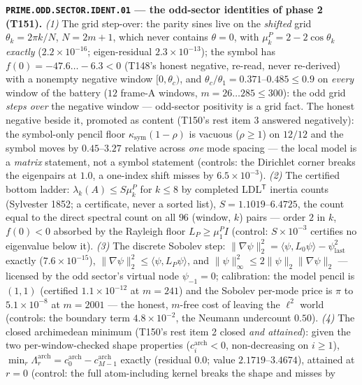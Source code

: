 \documentclass[11pt,a4paper]{article}
\begin{document}
\par\smallskip\noindent\textbf{\texttt{PRIME.ODD.SECTOR.IDENT.01} --- the
odd-sector identities of phase 2 (T151).}
\emph{(1)} The grid step-over: the parity sines live on the \emph{shifted}
grid $\theta_k=2\pi k/N$, $N=2m{+}1$, which never contains $\theta=0$, with
$\mu^P_k=2-2\cos\theta_k$ \emph{exactly} ($2.2\times10^{-16}$;
eigen-residual $2.3\times10^{-13}$); the symbol has
$f(0)=-47.6\ldots-6.3<0$ (T148's honest negative, re-read, never
re-derived) with a nonempty negative window $[0,\theta_c)$, and
$\theta_c/\theta_1=0.371$--$0.485\le0.9$ on \emph{every} window of the
battery ($12$ frame-A windows, $m=26\ldots285\le300$): the odd grid
\emph{steps over} the negative window --- odd-sector positivity is a grid
fact. The honest negative beside it, promoted as content (T150's rest item
3 answered negatively): the symbol-only pencil floor
$\kappa_{\mathrm{sym}}(1-\rho)$ is vacuous ($\rho\ge1$) on $12/12$ and the
symbol moves by $0.45$--$3.27$ relative across \emph{one} mode spacing ---
the local model is a \emph{matrix} statement, not a symbol statement
(controls: the Dirichlet corner breaks the eigenpairs at $1.0$, a one-index
shift misses by $6.5\times10^{-3}$). \emph{(2)} The certified bottom
ladder: $\lambda_k(A)\le S\mu^P_k$ for $k\le8$ by completed
LDL$^{\mathsf T}$ inertia counts (Sylvester 1852; a certificate, never a
sorted list), $S=1.1019$--$6.4725$, the count equal to the direct spectral
count on all $96$ (window, $k$) pairs --- order $2$ in $k$, $f(0)<0$
absorbed by the Rayleigh floor $L_P\ge\mu^P_1I$ (control:
$S\times10^{-3}$ certifies no eigenvalue below it). \emph{(3)} The discrete
Sobolev step: $\|\nabla\psi\|_2^2=\langle\psi,L_0\psi\rangle-
\psi_{\mathrm{last}}^2$ exactly ($7.6\times10^{-15}$),
$\|\nabla\psi\|_2^2\le\langle\psi,L_P\psi\rangle$, and
$\|\psi\|_\infty^2\le2\|\psi\|_2\|\nabla\psi\|_2$ --- licensed by the odd
sector's virtual node $\psi_{-1}=0$; calibration: the model pencil is
$(1,1)$ (certified $1.1\times10^{-12}$ at $m=241$) and the Sobolev
per-mode price is $\pi$ to $5.1\times10^{-8}$ at $m=2001$ --- the honest,
$m$-free cost of leaving the $\ell^2$ world (controls: the boundary term
$4.8\times10^{-2}$, the Neumann undercount $0.50$). \emph{(4)} The closed
archimedean minimum (T150's rest item 2 closed \emph{and attained}): given
the two per-window-checked shape properties ($c^{\mathrm{arch}}_i<0$,
non-decreasing on $i\ge1$),
$\min_r\Lambda^{\mathrm{arch}}_r=c^{\mathrm{arch}}_0-c^{\mathrm{arch}}_{M-1}$
exactly (residual $0.0$; value $2.1719$--$3.4674$), attained at $r=0$
(control: the full atom-including kernel breaks the shape and misses by
\end{document}
